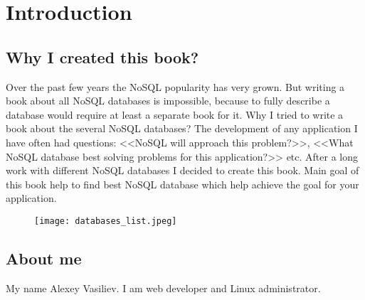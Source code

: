 \chapter{Introduction}

\section{Why I created this book?}

Over the past few years the NoSQL popularity has very grown. But writing a book about all NoSQL databases is impossible, because to fully describe a database would require at least a separate book for it. Why I tried to write a book about the several NoSQL databases? The development of any application I have often had questions: <<NoSQL will approach this problem?>>, <<What NoSQL database best solving problems for this application?>> etc. After a long work with different NoSQL databases I decided to create this book. Main goal of this book help to find best NoSQL database which help achieve the goal for your application.

\begin{figure}[hb]
  \centering
  \texttt{[image: databases\_list.jpeg]}
\end{figure}

\section{About me}

My name Alexey Vasiliev. I am web developer and Linux administrator.